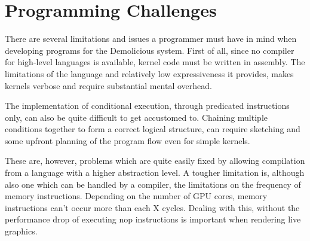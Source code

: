 \section{Programming Challenges}

There are several limitations and issues a programmer must have in mind when developing programs for the Demolicious system.
First of all, since no compiler for high-level languages is available, kernel code must be written in assembly.
The limitations of the language and relatively low expressiveness it provides,
makes kernels verbose and require substantial mental overhead.

The implementation of conditional execution, through predicated instructions only,
can also be quite difficult to get accustomed to.
Chaining multiple conditions together to form a correct logical structure,
can require sketching and some upfront planning of the program flow even for simple kernels.

These are, however, problems which are quite easily fixed by allowing compilation from a language with a higher abstraction level.
A tougher limitation is, although also one which can be handled by a compiler,
the limitations on the frequency of memory instructions.
Depending on the number of GPU cores,
memory instructions can't occur more than each X cycles.
Dealing with this, without the performance drop of executing nop instructions
is important when rendering live graphics.
